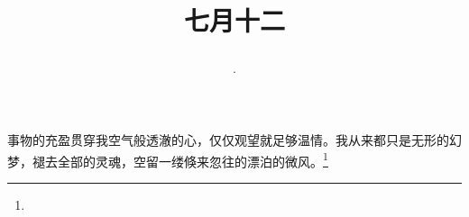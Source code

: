 \title{\date[d=15,m=8,y=2024][year:cn-y,年,month:cn,day:cn,日,·,weekday]·七月十二 }
事物的充盈贯穿我空气般透澈的心，仅仅观望就足够温情。我从来都只是无形的幻梦，褪去全部的灵魂，空留一缕倏来忽往的漂泊的微风。\footnote{ }

